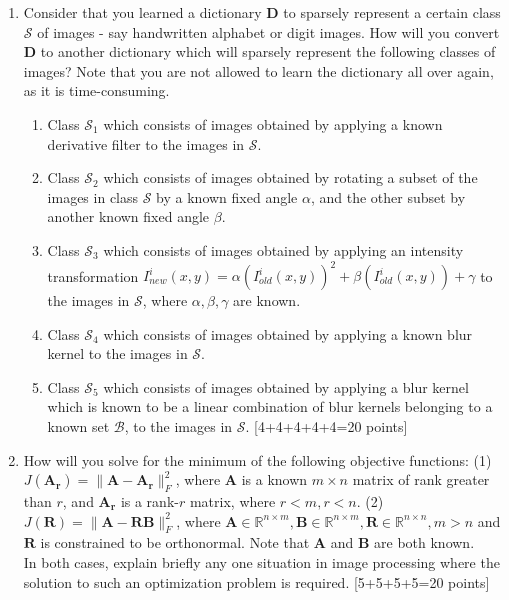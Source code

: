 \documentclass[11pt]{article}
\begin{document}
\begin{enumerate}
\item Consider that you learned a dictionary $\boldsymbol{D}$ to sparsely represent a certain class $\mathcal{S}$ of images - say handwritten alphabet or digit images. How will you convert $\boldsymbol{D}$ to another dictionary which will sparsely represent the following classes of images? Note that you are not allowed to learn the dictionary all over again, as it is time-consuming. 
\begin{enumerate}
\item Class $\mathcal{S}_1$ which consists of images obtained by applying a known derivative filter to the images in $\mathcal{S}$. 
\item Class $\mathcal{S}_2$ which consists of images obtained by rotating a subset of the images in class $\mathcal{S}$ by a known fixed angle $\alpha$, and the other subset by another known fixed angle $\beta$.
\item Class $\mathcal{S}_3$ which consists of images obtained by applying an intensity transformation $I^i_{new}(x,y) = \alpha (I^i_{old}(x,y))^2 + \beta (I^i_{old}(x,y)) + \gamma$ to the images in $\mathcal{S}$, where $\alpha,\beta,\gamma$ are known.  
\item Class $\mathcal{S}_4$ which consists of images obtained by applying a known blur kernel to the images in $\mathcal{S}$. 
\item Class $\mathcal{S}_5$ which consists of images obtained by applying a blur kernel which is known to be a linear combination of blur kernels belonging to a known set $\mathcal{B}$, to the images in $\mathcal{S}$. \textsf{[4+4+4+4+4=20 points]}
\end{enumerate}

\item How will you solve for the minimum of the following objective functions: (1) $J(\boldsymbol{A_r}) = \|\boldsymbol{A}-\boldsymbol{A_r}\|^2_F$, where $\boldsymbol{A}$ is a known $m \times n$ matrix of rank greater than $r$, and $\boldsymbol{A_r}$ is a rank-$r$ matrix, where $r < m, r < n$. (2) $J(\boldsymbol{R}) = \|\boldsymbol{A}-\boldsymbol{R} \boldsymbol{B}\|^2_F$, where $\boldsymbol{A} \in \mathbb{R}^{n \times m}, \boldsymbol{B} \in \mathbb{R}^{n \times m}, \boldsymbol{R} \in \mathbb{R}^{n \times n}, m > n$ and $\boldsymbol{R}$ is constrained to be orthonormal. Note that $\boldsymbol{A}$ and $\boldsymbol{B}$ are both known. \\
In both cases, explain briefly any one situation in image processing where the solution to such an optimization problem is required. \textsf{[5+5+5+5=20 points]}


\end{enumerate}
\end{document}

